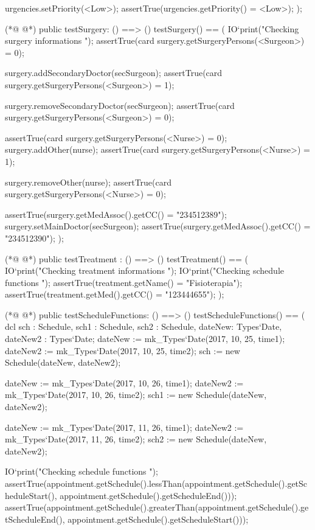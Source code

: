 \begin{vdmpp}[breaklines=true]
   urgencies.setPriority(<Low>);
   assertTrue(urgencies.getPriority() = <Low>);
  );
  
(*@
\label{testSurgery:196}
@*)
 public testSurgery: () ==> ()
  testSurgery() == (
   IO`print("\n Checking surgery informations \n");
   assertTrue(card surgery.getSurgeryPersons(<Surgeon>) = 0);
   
   surgery.addSecondaryDoctor(secSurgeon);
   assertTrue(card surgery.getSurgeryPersons(<Surgeon>) = 1);
  
   surgery.removeSecondaryDoctor(secSurgeon);
   assertTrue(card surgery.getSurgeryPersons(<Surgeon>) = 0);
   
   assertTrue(card surgery.getSurgeryPersons(<Nurse>) = 0);
   surgery.addOther(nurse);
   assertTrue(card surgery.getSurgeryPersons(<Nurse>) = 1);
   
   surgery.removeOther(nurse);
   assertTrue(card surgery.getSurgeryPersons(<Nurse>) = 0);
   
   assertTrue(surgery.getMedAssoc().getCC() = "234512389");
   surgery.setMainDoctor(secSurgeon);
   assertTrue(surgery.getMedAssoc().getCC() = "234512390");
 );
 
(*@
\label{testTreatment:219}
@*)
 public testTreatment : () ==> ()
  testTreatment() == (
   IO`print("\n Checking treatment informations \n");
   IO`print("\n Checking schedule functions \n");
   assertTrue(treatment.getName() = "Fisioterapia");
   assertTrue(treatment.getMed().getCC() = "123444655");
  );
  
(*@
\label{testScheduleFunctions:227}
@*)
  public testScheduleFunctions: () ==> ()
  testScheduleFunctions() == (
   dcl sch : Schedule, sch1 : Schedule, sch2 : Schedule, dateNew: Types`Date, dateNew2 : Types`Date;
   dateNew := mk_Types`Date(2017, 10, 25, time1);
   dateNew2 := mk_Types`Date(2017, 10, 25, time2);
   sch := new Schedule(dateNew, dateNew2);
   
   dateNew := mk_Types`Date(2017, 10, 26, time1);
   dateNew2 := mk_Types`Date(2017, 10, 26, time2);
   sch1 := new Schedule(dateNew, dateNew2);
   
   dateNew := mk_Types`Date(2017, 11, 26, time1);
   dateNew2 := mk_Types`Date(2017, 11, 26, time2);
   sch2 := new Schedule(dateNew, dateNew2);
   
   IO`print("\n Checking schedule functions \n");
   assertTrue(appointment.getSchedule().lessThan(appointment.getSchedule().getScheduleStart(), appointment.getSchedule().getScheduleEnd()));
   assertTrue(appointment.getSchedule().greaterThan(appointment.getSchedule().getScheduleEnd(), appointment.getSchedule().getScheduleStart()));
   

\end{vdmpp}
